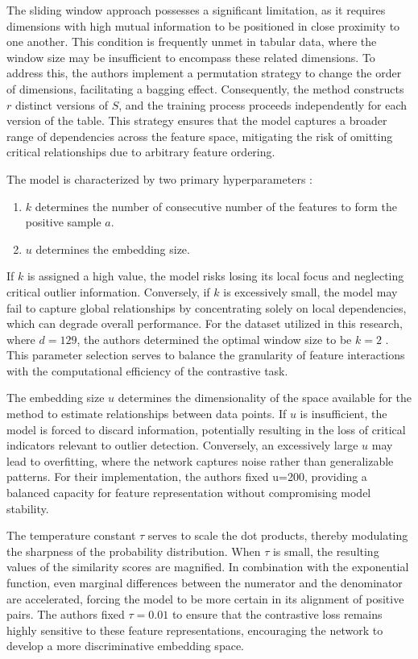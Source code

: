 The sliding window approach possesses a significant limitation, as it requires dimensions with high mutual information to be positioned in close proximity to one another. 
This condition is frequently unmet in tabular data, where the window size may be insufficient to encompass these related dimensions. 
To address this, the authors implement a permutation strategy to change the order of dimensions, facilitating a bagging effect. 
Consequently, the method constructs $r$ distinct versions of $S$, and the training process proceeds independently for each version of the table. 
This strategy ensures that the model captures a broader range of dependencies across the feature space, mitigating the risk of omitting critical relationships due to arbitrary feature ordering.


The model is characterized by two primary hyperparameters \citep[p. 3]{shenkar2022anomaly}:
\begin{enumerate}
    \item $k$ determines the number of consecutive number of the features to form the positive sample $a$.
    \item $u$ determines the embedding size.
\end{enumerate}

If $k$ is assigned a high value, the model risks losing its local focus and neglecting critical outlier information. 
Conversely, if $k$ is excessively small, the model may fail to capture global relationships by concentrating solely on local dependencies, which can degrade overall performance. 
For the dataset utilized in this research, where $d=129$, the authors determined the optimal window size to be $k=2$ \citep[p. 5]{shenkar2022anomaly}. 
This parameter selection serves to balance the granularity of feature interactions with the computational efficiency of the contrastive task.


The embedding size $u$ determines the dimensionality of the space available for the method to estimate relationships between data points. 
If $u$ is insufficient, the model is forced to discard information, potentially resulting in the loss of critical indicators relevant to outlier detection. 
Conversely, an excessively large $u$ may lead to overfitting, where the network captures noise rather than generalizable patterns. 
For their implementation, the authors fixed u=200, providing a balanced capacity for feature representation without compromising model stability.


The temperature constant $\tau$ serves to scale the dot products, thereby modulating the sharpness of the probability distribution. 
When $\tau$ is small, the resulting values of the similarity scores are magnified. 
In combination with the exponential function, even marginal differences between the numerator and the denominator are accelerated, forcing the model to be more certain in its alignment of positive pairs. 
The authors fixed $\tau = 0.01$ to ensure that the contrastive loss remains highly sensitive to these feature representations, encouraging the network to develop a more discriminative embedding space.

